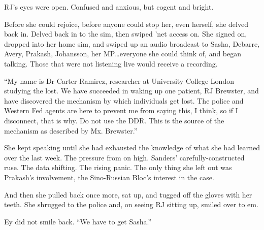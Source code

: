 RJ's eyes were open. Confused and anxious, but cogent and bright.

Before she could rejoice, before anyone could stop her, even herself, she delved back in. Delved back in to the sim, then swiped 'net access on. She signed on, dropped into her home sim, and swiped up an audio broadcast to Sasha, Debarre, Avery, Prakash, Johansson, her MP\ldots{}everyone she could think of, and began talking. Those that were not listening live would receive a recording.

``My name is Dr Carter Ramirez, researcher at University College London studying the lost. We have succeeded in waking up one patient, RJ Brewster, and have discovered the mechanism by which individuals get lost. The police and Western Fed agents are here to prevent me from saying this, I think, so if I disconnect, that is why. Do not use the DDR. This is the source of the mechanism as described by Mx. Brewster.''

She kept speaking until she had exhausted the knowledge of what she had learned over the last week. The pressure from on high. Sanders' carefully-constructed ruse. The data shifting. The rising panic. The only thing she left out was Prakash's involvement, the Sino-Russian Bloc's interest in the case.

And then she pulled back once more, sat up, and tugged off the gloves with her teeth. She shrugged to the police and, on seeing RJ sitting up, smiled over to em.

Ey did not smile back. ``We have to get Sasha.''
